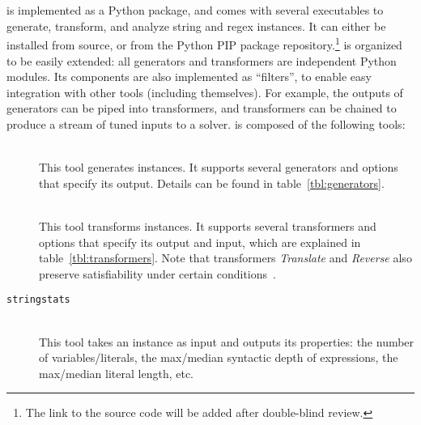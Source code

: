 \section{\fuzzer{}}
\label{sec:fuzzer}

\fuzzer{} is implemented as a Python package, and comes with several
executables to generate, transform, and analyze \smtfull{} string and regex
instances. It can either be installed from source, or from the Python
PIP package repository.\footnote{The link to the
source code will be added after double-blind review.}
\fuzzer{} is organized to be easily extended:
all generators and transformers are independent Python modules. Its
components are also implemented as \unix{} ``filters'', to enable easy
integration with other tools (including themselves). For example, the
outputs of generators can be piped into transformers, and transformers
can be chained to produce a stream of tuned inputs to a
solver. \fuzzer{} is composed of the following tools:
\begin{description}
    \item[\generator{}] \hfill \\
        This tool generates \smt{} instances. It supports several generators and
        options that specify its output. Details can be found in
        table~\ref{tbl:generators}.
    \item[\transformer{}] \hfill \\
        This tool transforms \smt{}
        instances. It supports several transformers and options that specify
        its output and input, which are explained in
        table~\ref{tbl:transformers}. Note that transformers
        \textit{Translate} and \textit{Reverse} also preserve
        satisfiability under certain conditions~\cite{ifaz}.
    \item[\texttt{stringstats}] \hfill \\
        This tool takes an \smt{}
        instance as input and outputs its properties: the number of
        variables/literals, the max/median syntactic depth of expressions, the
        max/median literal length, etc.
\end{description}

